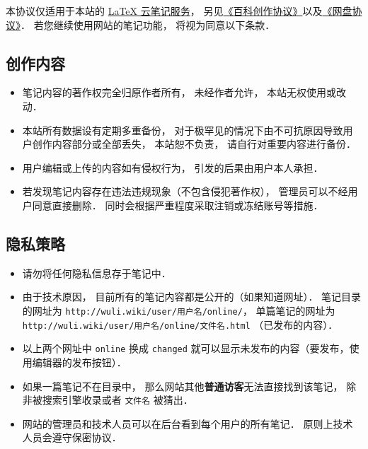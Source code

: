 
本协议仅适用于本站的 \href{http://example.com}{LaTeX 云笔记服务}， 另见\href{http://wuli.wiki/online/licens.html}{《百科创作协议》}以及\href{http://www.example.com}{《网盘协议》}． 若您继续使用网站的笔记功能， 将视为同意以下条款．

\subsection{创作内容}
\begin{itemize}
\item 笔记内容的著作权完全归原作者所有， 未经作者允许， 本站无权使用或改动．
\item 本站所有数据设有定期多重备份， 对于极罕见的情况下由不可抗原因导致用户创作内容部分或全部丢失， 本站恕不负责， 请自行对重要内容进行备份．
\item 用户编辑或上传的内容如有侵权行为， 引发的后果由用户本人承担．
\item 若发现笔记内容存在违法违规现象（不包含侵犯著作权）， 管理员可以不经用户同意直接删除． 同时会根据严重程度采取注销或冻结账号等措施．
\end{itemize}

\subsection{隐私策略}
\begin{itemize}
\item 请勿将任何隐私信息存于笔记中．
\item 由于技术原因， 目前所有的笔记内容都是公开的（如果知道网址）． 笔记目录的网址为 \verb|http://wuli.wiki/user/用户名/online/|， 单篇笔记的网址为 \verb|http://wuli.wiki/user/用户名/online/文件名.html| （已发布的内容）．
\item 以上两个网址中 \verb|online| 换成 \verb|changed| 就可以显示未发布的内容（要发布，使用编辑器的发布按钮）．
\item 如果一篇笔记不在目录中， 那么网站其他\textbf{普通访客}无法直接找到该笔记， 除非被搜索引擎收录或者 \verb|文件名| 被猜出．
\item 网站的管理员和技术人员可以在后台看到每个用户的所有笔记． 原则上技术人员会遵守保密协议．
\end{itemize}
